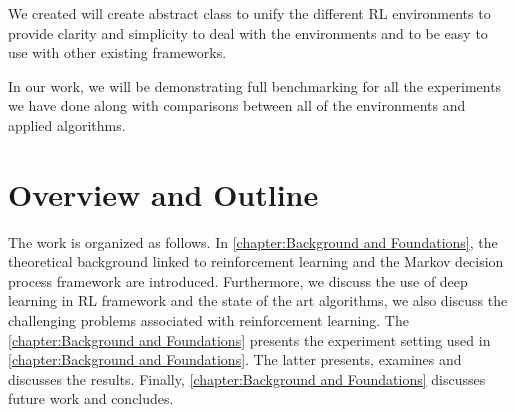 We created will create abstract class to unify the different RL environments to provide clarity and simplicity to deal with the environments and to be easy to use with other existing frameworks.

In our work, we will be demonstrating full benchmarking for all the experiments we have done along with comparisons between all of the environments and applied algorithms.

\section{Overview and Outline}
The work is organized as follows. In \autoref{chapter:Background and Foundations}, the theoretical background linked to reinforcement learning and the Markov decision process framework are introduced. Furthermore, we discuss the use of deep learning in RL framework and the state of the art algorithms, we also discuss the challenging problems associated with reinforcement learning.  The \autoref{chapter:Background and Foundations} presents the experiment setting used in \autoref{chapter:Background and Foundations}. The latter presents, examines and discusses the results. Finally, \autoref{chapter:Background and Foundations} discusses future work and concludes.